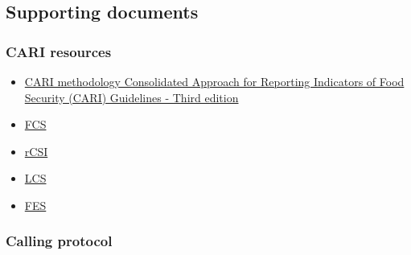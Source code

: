 \documentclass[11pt,harvard]{article}
\begin{document}
\pagebreak

\subsection{Supporting documents}
\subsubsection{CARI resources}
\begin{itemize}
		\item \href{https://resources.vam.wfp.org/data-analysis/quantitative/food-security/cari}{CARI methodology Consolidated Approach for Reporting Indicators of Food Security (CARI) Guidelines - Third edition}
		\item \href{https://resources.vam.wfp.org/data-analysis/quantitative/food-security/food-consumption-score}{FCS}
		\item \href{https://resources.vam.wfp.org/data-analysis/quantitative/food-security/reduced-coping-strategies-index}{rCSI}
		\item \href{https://resources.vam.wfp.org/data-analysis/quantitative/food-security/livelihood-coping-strategies-food-security}{LCS}
		\item \href{https://resources.vam.wfp.org/data-analysis/quantitative/food-security/food-expenditure-share}{FES}
\end{itemize} 

\subsubsection{Calling protocol}

	
\end{document}
